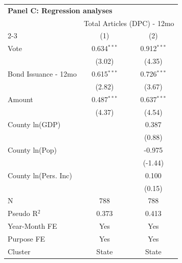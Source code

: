 \vspace{-0.75em}
\begingroup
\centering
\begin{tabular*}{\textwidth}{@{\extracolsep{\fill}}lcc}
\multicolumn{3}{l}{\textbf{Panel C: Regression analyses}}\\

\addlinespace
   \toprule
    & \multicolumn{2}{c}{Total Articles (DPC) - 12mo}\\
   \cmidrule(lr){2-3}
                        & (1)           & (2)\\  
   \midrule 
   Vote                 & 0.634$^{***}$ & 0.912$^{***}$\\   
                        & (3.02)       & (4.35)\\   
   Bond Issuance - 12mo & 0.615$^{***}$ & 0.726$^{***}$\\   
                        & (2.82)       & (3.67)\\   
   Amount               & 0.487$^{***}$ & 0.637$^{***}$\\   
                        & (4.37)       & (4.54)\\   
   County ln(GDP)       &               & 0.387\\   
                        &               & (0.88)\\   
   County ln(Pop)       &               & -0.975\\   
                        &               & (-1.44)\\   
   County ln(Pers. Inc) &               & 0.100\\   
                        &               & (0.15)\\   
   \hline
   N         & 788           & 788\\  
   Pseudo R$^2$         & 0.373         & 0.413\\  
   Year-Month FE        & Yes           & Yes\\  
   Purpose FE           & Yes           & Yes\\  
   Cluster              & State & State\\  
   \bottomrule
\end{tabular*}
\par\endgroup
